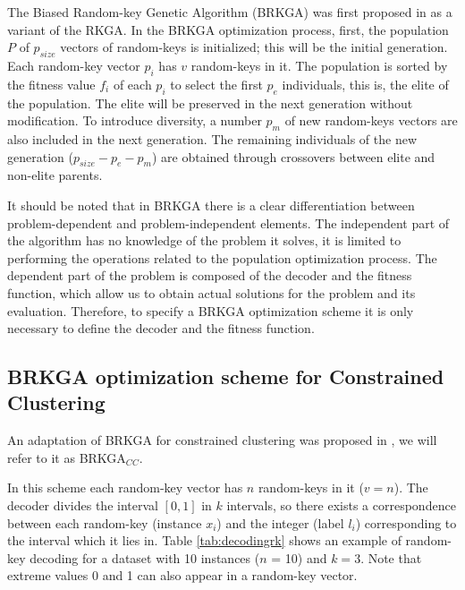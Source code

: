 \documentclass[review]{elsarticle}
\begin{document}
The Biased Random-key Genetic Algorithm (BRKGA) was first proposed in \cite{gonccalves2011biased} as a variant of the RKGA. In the BRKGA optimization process, first, the population $P$ of $p_{size}$ vectors of random-keys is initialized; this will be the initial generation. Each random-key vector $p_i$ has $v$ random-keys in it. The population is sorted by the fitness value $f_i$ of each $p_i$ to select the first $p_e$ individuals, this is, the elite of the population. The elite will be preserved in the next generation without modification. To introduce diversity, a number $p_m$ of new random-keys vectors are also included in the next generation. The remaining individuals of the new generation ($p_{size} - p_e - p_m$) are obtained through crossovers between elite and non-elite parents.

It should be noted that in BRKGA there is a clear differentiation between problem-dependent and problem-independent elements. The independent part of the algorithm has no knowledge of the problem it solves, it is limited to performing the operations related to the population optimization process. The dependent part of the problem is composed of the decoder and the fitness function, which allow us to obtain actual solutions for the problem and its evaluation. Therefore, to specify a BRKGA optimization scheme it is only necessary to define the decoder and the fitness function. \cite{gonccalves2011biased}

\subsection{BRKGA optimization scheme for Constrained Clustering} \label{sec:AdaptationofBRKGA}

An adaptation of BRKGA for constrained clustering was proposed in \cite{de2017comparison}, we will refer to it as BRKGA$_{CC}$.

In this scheme each random-key vector has $n$ random-keys in it ($v = n$). The decoder divides the interval $[0,1]$ in $k$ intervals, so there exists a correspondence between each random-key (instance $x_i$) and the integer (label $l_i$) corresponding to the interval which it lies in. Table \ref{tab:decodingrk} shows an example of random-key decoding for a dataset with 10 instances ($n$ = 10) and $k = 3$. Note that extreme values 0 and 1 can also appear in a random-key vector.
\end{document}
